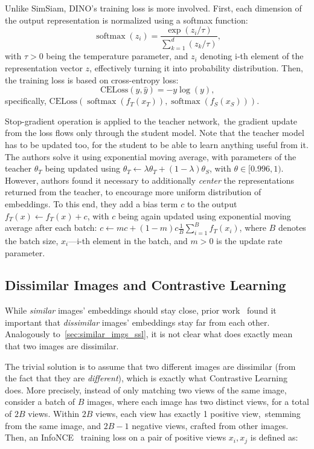 Unlike SimSiam, DINO's training loss is more involved. First, each dimension of the output representation is normalized using a softmax function:
\begin{equation}
    \operatorname{softmax}(z_i)=\frac{\exp(z_i/\tau)}{\sum_{k=1}^{d}(z_k/\tau)}\text{,} 
    \label{eq:softmax}
\end{equation}
with $\tau>0$ being the temperature parameter, and $z_i$ denoting i-th element of the representation vector $z$, effectively turning it into probability distribution. Then, the training loss is based on cross-entropy loss:
\begin{equation}
    \text{CELoss}(y,\hat{y})=-y\log(y)\text{,} 
    \label{eq:celoss}   
\end{equation}
specifically, $\text{CELoss}\left(\operatorname{softmax}\left(f_T\left(x_T\right)\right),\operatorname{softmax}\left(f_S\left(x_S\right)\right)\right)$.

Stop-gradient operation is applied to the teacher network,~\ie the gradient update from the loss flows only through the student model. Note that the teacher model has to be updated too, for the student to be able to learn anything useful from it. The authors solve it using exponential moving average, with parameters of the teacher $\theta_T$ being updated using $\theta_T\leftarrow\lambda\theta_T+(1-\lambda)\theta_S$, with $\theta\in[0.996,1)$. However, authors found it necessary to additionally \textit{center} the representations returned from the teacher, to encourage more uniform distribution of embeddings. To this end, they add a bias term $c$ to the output $f_T(x)\leftarrow f_T(x)+c$, with $c$ being again updated using exponential moving average after each batch: $c\leftarrow mc+(1-m)c\frac{1}{B}\sum_{i=1}^{B}f_T(x_i)$, where $B$ denotes the batch size, $x_i$---i-th element in the batch, and $m>0$ is the update rate parameter.

\subsection{Dissimilar Images and Contrastive Learning}

While \textit{similar} images' embeddings should stay close, prior work~\cite{clip,simclr} found it important that \textit{dissimilar} images' embeddings stay far from each other. Analogously to~\cref{sec:similar_imgs_ssl}, it is not clear what does exactly mean that two images are dissimilar. 

The trivial solution is to assume that two different images are dissimilar (from the fact that they are \textit{different}), which is exactly what Contrastive Learning~\cite{contrastivelearningog} does. More precisely, instead of only matching two views of the same image, consider a batch of $B$ images, where each image has two distinct views, for a total of $2B$ views. Within $2B$ views, each view has exactly 1 positive view,~\ie stemming from the same image, and $2B-1$ negative views, crafted from other images. Then, an InfoNCE~\cite{infonceloss} training loss on a pair of positive views $x_i,x_j$ is defined as:

